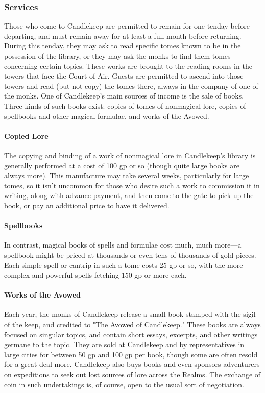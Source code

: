 \documentclass[10pt,a4paper,twoside,twocolumn,openany,bg=print,nodeprecatedcode]{dndbook}
\begin{document}
\subsubsection{Services}
Those who come to Candlekeep are permitted to remain for one tenday before departing, and must remain away for at least a full month before returning. During this tenday, they may ask to read specific tomes known to be in the possession of the library, or they may ask the monks to find them tomes concerning certain topics. These works are brought to the reading rooms in the towers that face the Court of Air. Guests are permitted to ascend into those towers and read (but not copy) the tomes there, always in the company of one of the monks.
One of Candlekeep's main sources of income is the sale of books. Three kinds of such books exist: copies of tomes of nonmagical lore, copies of spellbooks and other magical formulae, and works of the Avowed.
\paragraph{Copied Lore}
The copying and binding of a work of nonmagical lore in Candlekeep's library is generally performed at a cost of 100 gp or so (though quite large books are always more). This manufacture may take several weeks, particularly for large tomes, so it isn't uncommon for those who desire such a work to commission it in writing, along with advance payment, and then come to the gate to pick up the book, or pay an additional price to have it delivered.
\paragraph{Spellbooks}
In contrast, magical books of spells and formulae cost much, much more—a spellbook might be priced at thousands or even tens of thousands of gold pieces. Each simple spell or cantrip in such a tome costs 25 gp or so, with the more complex and powerful spells fetching 150 gp or more each.
\paragraph{Works of the Avowed}
Each year, the monks of Candlekeep release a small book stamped with the sigil of the keep, and credited to "The Avowed of Candlekeep." These books are always focused on singular topics, and contain short essays, excerpts, and other writings germane to the topic. They are sold at Candlekeep and by representatives in large cities for between 50 gp and 100 gp per book, though some are often resold for a great deal more.
Candlekeep also buys books and even sponsors adventurers on expeditions to seek out lost sources of lore across the Realms. The exchange of coin in such undertakings is, of course, open to the usual sort of negotiation.
\end{document}

